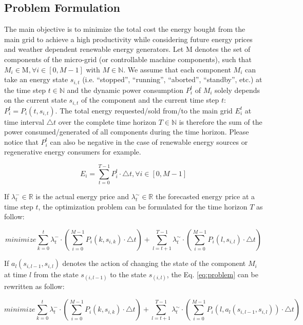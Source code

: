 \subsection{Problem Formulation}\label{subsec:32}
The main objective is to minimize the total cost the energy bought from the main grid to achieve a high productivity while considering future energy prices and weather dependent renewable energy generators. Let $\mathrm{M}$ denotes the set of components of the micro-grid (or controllable machine components), such that $M_i \in \mathrm{M}, \forall i \in [0, M-1]$  with $ M \in \mathbb{N}$. We assume that each component $M_i$ can take an energy state $s_{i,t}$ (i.e. “stopped”, “running”, “aborted”, “standby”, etc.) at the time step $t  \in \mathbb{N}$ and the dynamic power consumption $P_i^t$ of $M_i$ solely depends on the current state $s_{i,t}$ of the component and the current time step $t$: $P_i^t=P_i (t, s_{i,t})$. The total energy requested/sold from/to the main grid $E_i^t$ at time interval $\triangle t$ over the complete time horizon $T \in \mathbb{N}$ is therefore the sum of the power consumed/generated of all components during the time horizon. Please notice that $P_i^t$ can also be negative in the case of renewable energy sources or regenerative energy consumers for example.

%
\begin{equation}
E_i =\sum_{t=0}^{T-1}{ P_i^t \cdot \triangle t}, \forall i \in [0, M-1]
\end{equation}
%

 If $\lambda_t^- \in \mathbb{R}$ is the actual energy price and $\lambda_t^\sim \in \mathbb{R}$ the forecasted energy price at a time step $t$, the optimization problem can be formulated for the time horizon $T$ as follow:

%
\begin{equation}
\label{eq:problem}
minimize \sum_{k=0}^{t}{ {\lambda_t^-} \cdot ({ \sum_{i=0}^{M-1}{ P_i (k, s_{i,k}) \cdot \triangle t } })}+  \sum_{l=t+1}^{T-1}{\lambda_t^\sim \cdot ({ \sum_{i=0}^{M-1}{ P_i (l, s_{i,l}) \cdot \triangle t  } }) }
\end{equation}

If $a_l (s_{i,l-1},s_{i,l})$ denotes the action of changing the state of the component $M_i$ at time $l$ from the state $s_(i,l-1)$ to the state $s_(i,l)$, the Eq. \ref{eq:problem} can be rewritten as follow:

\begin{equation}
\label{eq:problem_reformulated}
minimize \sum_{k=0}^{t}{ {\lambda_t^-} \cdot ({ \sum_{i=0}^{M-1}{ P_i (k, s_{i,k}) \cdot \triangle t } })}+  \sum_{l=t+1}^{T-1}{\lambda_t^\sim \cdot ({ \sum_{i=0}^{M-1}{ P_i (l, a_l (s_{i,l-1},s_{i,l})) \cdot \triangle t  } }) }
\end{equation}

